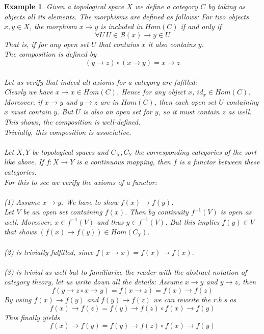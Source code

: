 \documentclass[17pt]{extarticle}
\newtheorem{example}{Example}
\begin{document}
\begin{example}
	Given a topological space $X$ we define a category $C$ by taking as objects all its elements.
	The morphisms are defined as follows: For two objects $x,y\in X$, the morphism $x\rightarrow y$ is included in
	$Hom(C)$ if and only if 
	$$\forall U \ U\in \mathcal{B}(x) \rightarrow y\in U$$
	That is, if for any open set $U$ that contains $x$ it also contains $y$.\\
	The composition is defined by
	$$(y\rightarrow z)\circ (x\rightarrow y)  = x\rightarrow z$$\\
	Let us verify that indeed all axioms for a category are fufilled:\\
	Clearly we have $x\rightarrow x\in Hom(C)$. Hence for any object $x$, $id_x\in Hom(C)$.\\	
	Moreover, if $x\rightarrow y$ and $y\rightarrow z$ are in $Hom(C)$, then each open set $U$ containing $x$ must
	contain $y$. But $U$ is also an open set for $y$, so it must contain $z$ as well. This shows, the composition is well-defined.\\
	Trivially, this composition is associative.\\ \\
	Let $X, Y$ be topological spaces and $C_X, C_Y$ the corresponding categories of the sort like above. If $f: X\rightarrow Y$ is a continuous mapping, then $f$ is a functor between these categories.\\
	For this to see we verify the axioms of a functor:\\ \\
	(1) Assume $x\rightarrow y$. We have to show $f(x)\rightarrow f(y)$.\\	
	Let $V$ be an open set containing $f(x)$. Then by continuity $f^{-1}(V)$ is open as well. Moreover, $x\in f^{-1}(V)$ and thus $y\in f^{-1}(V)$. But this implies $f(y)\in V$ that shows $(f(x)\rightarrow f(y))\in Hom(C_Y)$.\\ \\
	
	
	(2) is trivially fulfilled, since $f(x\rightarrow x)=f(x)\rightarrow f(x)$.\\ \\
	
	(3) is trivial as well but to familiarize the reader with the abstract notation of category theory, let us write down all the details: Assume $x\rightarrow y$ and $y\rightarrow z$, then
	$$f(y\rightarrow z \circ x\rightarrow y)=f(x\rightarrow z)= f(x)\rightarrow f(z)$$
	By using $f(x)\rightarrow f(y)$ and $f(y)\rightarrow f(z)$ we can rewrite the r.h.s as
	$$f(x)\rightarrow f(z)=f(y)\rightarrow f(z)\circ f(x)\rightarrow f(y)$$
	This finally yields
	$$f(x)\rightarrow f(y)=f(y)\rightarrow f(z)\circ f(x)\rightarrow f(y)$$\\
	

\end{example}
\end{document}
